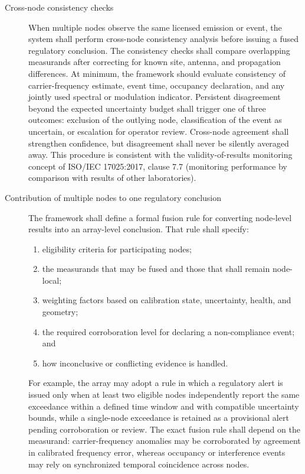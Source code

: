 \documentclass[11pt]{article}
\begin{document}
\begin{description}
\item[Cross-node consistency checks] When multiple nodes observe the same licensed emission or event, the system shall perform cross-node consistency analysis before issuing a fused regulatory conclusion. The consistency checks shall compare overlapping measurands after correcting for known site, antenna, and propagation differences. At minimum, the framework should evaluate consistency of carrier-frequency estimate, event time, occupancy declaration, and any jointly used spectral or modulation indicator. Persistent disagreement beyond the expected uncertainty budget shall trigger one of three outcomes: exclusion of the outlying node, classification of the event as uncertain, or escalation for operator review. Cross-node agreement shall strengthen confidence, but disagreement shall never be silently averaged away. This procedure is consistent with the validity-of-results monitoring concept of ISO/IEC 17025:2017, clause 7.7 (monitoring performance by comparison with results of other laboratories).

\item[Contribution of multiple nodes to one regulatory conclusion] The framework shall define a formal fusion rule for converting node-level results into an array-level conclusion. That rule shall specify:
\begin{enumerate}
    \item eligibility criteria for participating nodes;
    \item the measurands that may be fused and those that shall remain node-local;
    \item weighting factors based on calibration state, uncertainty, health, and geometry;
    \item the required corroboration level for declaring a non-compliance event; and
    \item how inconclusive or conflicting evidence is handled.
\end{enumerate}
For example, the array may adopt a rule in which a regulatory alert is issued only when at least two eligible nodes independently report the same exceedance within a defined time window and with compatible uncertainty bounds, while a single-node exceedance is retained as a provisional alert pending corroboration or review. The exact fusion rule shall depend on the measurand: carrier-frequency anomalies may be corroborated by agreement in calibrated frequency error, whereas occupancy or interference events may rely on synchronized temporal coincidence across nodes.


\end{description}
\end{document}

